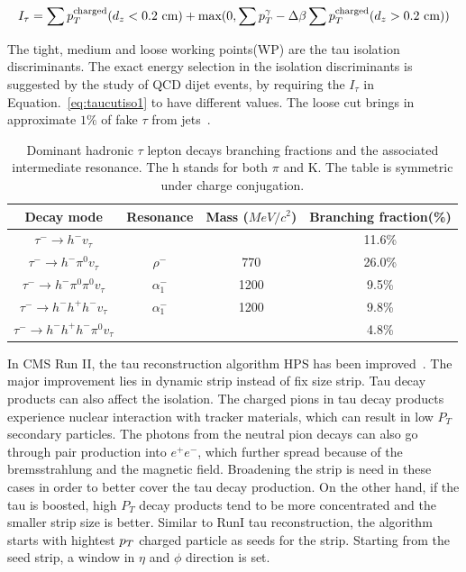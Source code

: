\begin{align}
I_{\tau}=\sum \pt^{\text{charged}} (d_{z}<0.2 \ \text{cm})+\text{max}(0,\sum \pt^{\gamma}-\Delta \beta \sum \pt^{\text{charged}} (d_{z}>0.2 \ \text{cm}))\label{eq:taucutiso1}
\end{align}

The tight, medium and loose working points(WP) are the tau isolation discriminants. The exact energy selection in the isolation discriminants is suggested by the study of QCD dijet events, by requiring the $I_{\tau}$ in Equation.~\ref{eq:taucutiso1} to have different values. The loose cut brings in approximate $1\%$ of fake $\tau$ from jets~\cite{TauIdentiRunI}. 


\begin{table}[htp]
\caption{Dominant hadronic $\tau$ lepton decays branching fractions and the associated intermediate resonance. The h stands for both $\pi$ and K. The table is symmetric under charge conjugation.}\label{tb:tauHdecay}
\begin{center}
\begin{tabular}{|c|c|c|c|}
\hline
Decay mode                                             & Resonance & Mass ($MeV/c^{2}$) & Branching fraction(\%)\\\hline
$\tau^{-}\to h^{-}v_{\tau}$                                     &                                  &           &  11.6\%     \\
$\tau^{-}\to h^{-}\pi^{0} v_{\tau}$                       & $\rho^{-}$                 & 770     &   26.0\%      \\
$\tau^{-}\to h^{-}\pi^{0} \pi^{0}  v_{\tau}$       & $\alpha_{1}^{-}$       & 1200   &   9.5\%     \\
$\tau^{-}\to h^{-}h^{+}h^{-}v_{\tau}$                     & $\alpha_{1}^{-}$       &  1200  &   9.8\%  \\
$\tau^{-}\to h^{-}h^{+}h^{-}\pi^{0} v_{\tau}$      &                                  &            &   4.8\% \\\hline
 \end{tabular}
\end{center}
\end{table}


In CMS Run II, the tau reconstruction algorithm HPS has been improved~\cite{TauRecoandIDRunII}. The major improvement lies in dynamic strip instead of fix size strip. Tau decay products can also affect the isolation. The charged pions in tau decay products experience nuclear interaction with tracker materials, which can result in low $P_{T}$ secondary particles. The photons from the neutral pion decays can also go through pair production into $e^{+}e^{-}$, which further spread because of the bremsstrahlung and the magnetic field. Broadening the strip is need in these cases in order to better cover the tau decay production. On the other hand, if the tau is boosted, high $P_{T}$ decay products tend to be more concentrated and the smaller strip size is better. Similar to RunI tau reconstruction, the algorithm starts with hightest $p_{T}$ charged particle as seeds for the strip. Starting from the seed strip, a window in $\eta$ and $\phi$ direction is set.  

